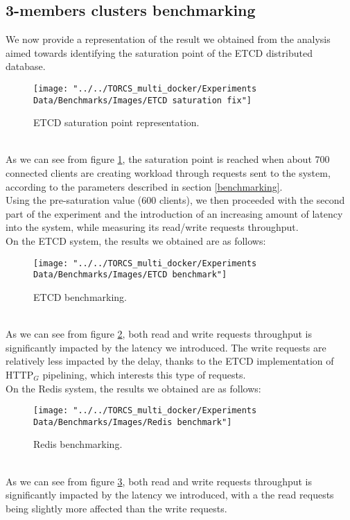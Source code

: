 \subsection{3-members clusters benchmarking}
We now provide a representation of the result we obtained from the analysis aimed towards identifying the saturation point of the ETCD distributed database.
\begin{figure}[h!]
	\centering
	\texttt{[image: "../../TORCS\_multi\_docker/Experiments Data/Benchmarks/Images/ETCD saturation fix"]}
	\caption[ETCD saturation point representation.]{ETCD saturation point representation.}
	\label{fig:etcd-saturation-fix}
\end{figure}
\\ As we can see from figure \ref{fig:etcd-saturation-fix}, the saturation point is reached when about 700 connected clients are creating workload through requests sent to the system, according to the parameters described in section \ref{benchmarking}. \\
Using the pre-saturation value (600 clients), we then proceeded with the second part of the experiment and the introduction of an increasing amount of latency into the system, while measuring its read/write requests throughput. \\
On the ETCD system, the results we obtained are as follows:
\begin{figure}[h!]
	\centering
	\texttt{[image: "../../TORCS\_multi\_docker/Experiments Data/Benchmarks/Images/ETCD benchmark"]}
	\caption[ETCD benchmarking.]{ETCD benchmarking.}
	\label{fig:etcd-benchmark}
\end{figure}
\\ As we can see from figure \ref{fig:etcd-benchmark}, both read and write requests throughput is significantly impacted by the latency we introduced. The write requests are relatively less impacted by the delay, thanks to the ETCD implementation of HTTP$_G$ pipelining, which interests this type of requests. \\
On the Redis system, the results we obtained are as follows:
\begin{figure}[h!]
	\centering
	\texttt{[image: "../../TORCS\_multi\_docker/Experiments Data/Benchmarks/Images/Redis benchmark"]}
	\caption[Redis benchmarking]{Redis benchmarking.}
	\label{fig:redis-benchmark}
\end{figure}
\\ As we can see from figure \ref{fig:redis-benchmark}, both read and write requests throughput is significantly impacted by the latency we introduced, with a the read requests being slightly more affected than the write requests.

